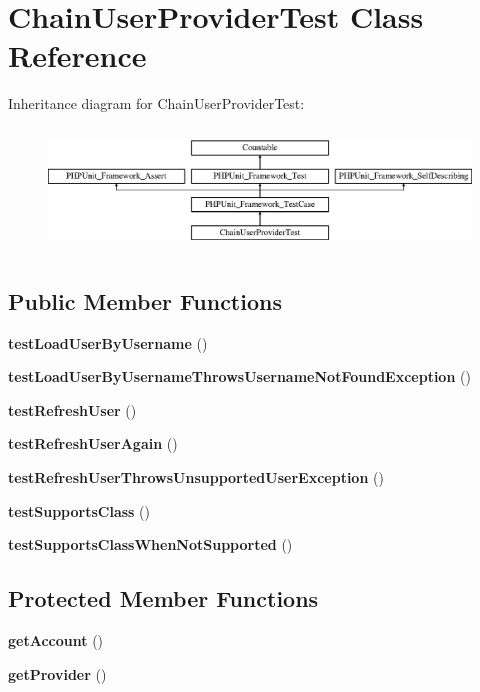 \section{Chain\+User\+Provider\+Test Class Reference}
\label{class_symfony_1_1_component_1_1_security_1_1_core_1_1_tests_1_1_user_1_1_chain_user_provider_test}
Inheritance diagram for Chain\+User\+Provider\+Test\+:\begin{figure}[H]
\begin{center}
\leavevmode
\includegraphics[height=3.303835cm]{class_symfony_1_1_component_1_1_security_1_1_core_1_1_tests_1_1_user_1_1_chain_user_provider_test}
\end{center}
\end{figure}
\subsection*{Public Member Functions}
\begin{DoxyCompactItemize}
\item 
{\bf test\+Load\+User\+By\+Username} ()
\item 
{\bf test\+Load\+User\+By\+Username\+Throws\+Username\+Not\+Found\+Exception} ()
\item 
{\bf test\+Refresh\+User} ()
\item 
{\bf test\+Refresh\+User\+Again} ()
\item 
{\bf test\+Refresh\+User\+Throws\+Unsupported\+User\+Exception} ()
\item 
{\bf test\+Supports\+Class} ()
\item 
{\bf test\+Supports\+Class\+When\+Not\+Supported} ()
\end{DoxyCompactItemize}
\subsection*{Protected Member Functions}
\begin{DoxyCompactItemize}
\item 
{\bf get\+Account} ()
\item 
{\bf get\+Provider} ()
\end{DoxyCompactItemize}

